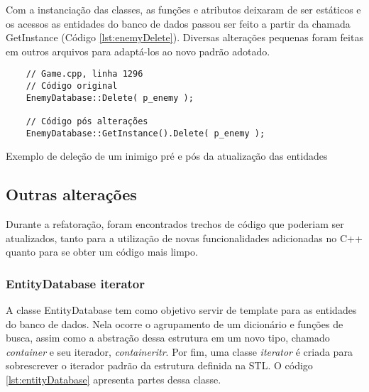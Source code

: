 Com a instanciação das classes, as funções e atributos deixaram de ser estáticos e os acessos 
as entidades do banco de dados passou ser feito a partir da chamada GetInstance (Código \ref{lst:enemyDelete}). 
Diversas alterações pequenas foram feitas em outros arquivos para adaptá-los ao novo padrão adotado.

\begin{listing}[!ht]
    \begin{verbatim}
    // Game.cpp, linha 1296
    // Código original
    EnemyDatabase::Delete( p_enemy );

    // Código pós alterações
    EnemyDatabase::GetInstance().Delete( p_enemy );
    \end{verbatim}
\caption{Exemplo de deleção de um inimigo pré e pós da atualização das entidades}
\label{lst:enemyDelete}
\end{listing}

\subsection{Outras alterações}

Durante a refatoração, foram encontrados trechos de código que poderiam ser atualizados, tanto
para a utilização de novas funcionalidades adicionadas no C++ quanto para se obter um código mais limpo.

\subsubsection{EntityDatabase iterator}

A classe EntityDatabase tem como objetivo servir de template para as entidades do banco de dados. 
Nela ocorre o agrupamento de um dicionário e funções de busca, assim como a abstração dessa 
estrutura em um novo tipo, chamado \textit{container} e seu iterador, \textit{containeritr}. 
Por fim, uma classe \textit{iterator} é criada para sobrescrever o iterador padrão da estrutura 
definida na STL. O código \ref{lst:entityDatabase} apresenta partes dessa classe.

